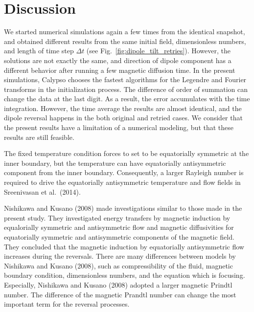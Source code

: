 \section{Discussion}
\label{section:discussion}

We started {\color{red} numerical} simulations again a few times from the 
{\color{red} identical}
snapshot, and obtained different results from the same initial field, dimensionless numbers, and length of time step $\Delta t$ (see Fig.~\ref{fig:dipole_tilt_retries}). 
However, the solutions are not exactly the same, and direction of dipole component has a different behavior after running a few magnetic diffusion time. 
In the present simulations, Calypso chooses the fastest algorithms for the Legendre and Fourier transforms in the initialization process. 
The difference of order of summation can change the data at the last digit. 
As a result, the error accumulates with the time integration. However, the time average the results are almost identical, and the dipole reversal happens in the both original and retried cases. 
We consider that the present results have a limitation of a numerical modeling, but that these results are still feasible.

The fixed temperature condition forces to set to be equatorially symmetric at the inner boundary, but the temperature can have equatorially antisymmetric component from the inner boundary. 
Consequently, a larger Rayleigh number is required to drive the equatorially antisymmetric temperature and flow fields in Sreenivasan et al.\ (2014).

Nishikawa and Kusano (2008) \cite{Nishikawa:2008} made  investigations similar to {\color{red} those made in} the present study.
They investigated energy 
{\color{red} transfers} 
by magnetic induction by equalorially symmetric and antisymmetric flow and magnetic diffusivities for equatorially symmetric and antisymmetric components of the magnetic field. 
They concluded that the magnetic induction by equatorially antisymmetric flow increases during the reversals. 
There are many differences between models by Nishikawa and Kusano (2008), such as compressibility of the fluid, magnetic boundary condition, dimensionless numbers, and the equation which is focusing. Especially, Nishikawa and Kusano (2008) adopted a larger magnetic Prindtl number. 
The difference of the magnetic Prandtl number can change the most important term for the reversal processes.

